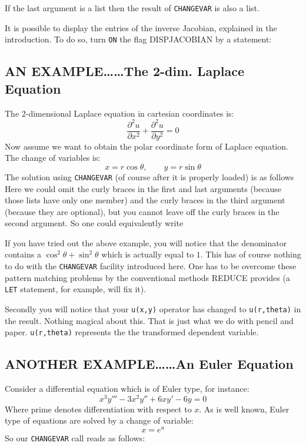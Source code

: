 If the last argument is a list then the result of {\tt CHANGEVAR} is also a
list.

It is possible to display the entries of the inverse Jacobian, explained
in the introduction.  To do so, turn {\tt ON} the flag {DISPJACOBIAN} by a
statement: 

\subsection{AN EXAMPLE\ldots\ldots The 2-dim. Laplace Equation}
The 2-dimensional Laplace equation in cartesian coordinates is:
\[
   \frac{\partial^{2} u}{\partial x^{2}} +
   \frac{\partial^{2} u}{\partial y^{2}} = 0
\]
Now assume we want to obtain the polar coordinate form of Laplace equation.
The change of variables is:
\[
   x = r \cos \theta, \qquad  y = r \sin \theta
\]
The solution using {\tt CHANGEVAR}  (of course after it is properly loaded)
is as follows
Here we could omit the curly braces in the first and last arguments (because
those lists have only one member) and the curly braces in the third argument
(because they are optional), but you cannot leave off the curly braces in the
second argument. So one could equivalently write

If you have tried out the above example, you will notice that the denominator
contains a $\cos^{2} \theta + \sin^{2} \theta$ which is actually equal to $1$.
This has of course nothing to do with the {\tt CHANGEVAR} facility introduced
here.  One has to be overcome these pattern matching problems by the
conventional methods REDUCE provides (a {\tt LET} statement, for example,
will fix it).

Secondly you will notice that your {\tt u(x,y)} operator has changed to
{\tt u(r,theta)} in the result. Nothing magical  about this. That is just what
we do with pencil and paper. {\tt u(r,theta)} represents the  the transformed
dependent variable.

\subsection{ANOTHER EXAMPLE\ldots\ldots An Euler Equation}
Consider a differential equation which is of Euler type, for instance:
\[
   x^{3}y''' - 3 x^{2}y'' + 6 x y' - 6 y = 0
\]
Where prime denotes differentiation with respect to $x$. As is well known,
Euler type of equations are solved by a change of variable:
\[
   x = e^{u}
\]
So our  {\tt CHANGEVAR} call reads as follows:




